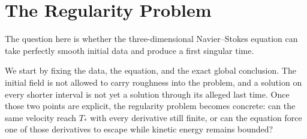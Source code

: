 \section{The Regularity Problem}\label{sec:TheRegularityProblem}

The question here is whether the three-dimensional Navier--Stokes equation can
take perfectly smooth initial data and produce a first singular time.

We start by fixing the data, the equation, and the exact global conclusion.
The initial field is not allowed to carry roughness into the problem, and a
solution on every shorter interval is not yet a solution through its alleged
last time.  Once those two points are explicit, the regularity problem becomes
concrete: can the same velocity reach \(T_*\) with every derivative still
finite, or can the equation force one of those derivatives to escape while
kinetic energy remains bounded?

\begingroup
\renewcommand{\theequation}{\thesection.\arabic{equation}}
\renewcommand{\theHequation}{\thesection.\arabic{equation}}

\endgroup
